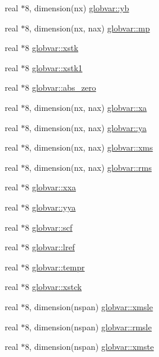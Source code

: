 \begin{DoxyCompactItemize}
\item 
real $\ast$8, dimension(nx) \hyperlink{namespaceglobvar_a77b51c294ee3b20cb6e14dcbf4cb6b3d}{globvar\+::yb}
\item 
real $\ast$8, dimension(nx, nax) \hyperlink{namespaceglobvar_a4616d2799c88911e5e46e57902cfa3a2}{globvar\+::mp}
\item 
real $\ast$8 \hyperlink{namespaceglobvar_a578ffe411cb075eda2ae3cf7781d1cb0}{globvar\+::xstk}
\item 
real $\ast$8 \hyperlink{namespaceglobvar_a6b041a8fbed932e28a5d0426dc9dc20a}{globvar\+::xstk1}
\item 
real $\ast$8 \hyperlink{namespaceglobvar_a2ffa8ff8b7b664c43c8c171090806037}{globvar\+::abs\+\_\+zero}
\item 
real $\ast$8, dimension(nx, nax) \hyperlink{namespaceglobvar_a8fc7e5c4a3ef5051faf2730bf96a2dd1}{globvar\+::xa}
\item 
real $\ast$8, dimension(nx, nax) \hyperlink{namespaceglobvar_a53530e27d02ce2d76dafdca13f4b8ed7}{globvar\+::ya}
\item 
real $\ast$8, dimension(nx, nax) \hyperlink{namespaceglobvar_a955f6af8ca3ef2d2ad1dc152f84503a6}{globvar\+::xms}
\item 
real $\ast$8, dimension(nx, nax) \hyperlink{namespaceglobvar_aad49b3042db6c69206144f3ad9ea8192}{globvar\+::rms}
\item 
real $\ast$8 \hyperlink{namespaceglobvar_afad18bcdd2851c42afdc9ace1240fad7}{globvar\+::xxa}
\item 
real $\ast$8 \hyperlink{namespaceglobvar_a8226618dfb2a1887783a72d33a768b30}{globvar\+::yya}
\item 
real $\ast$8 \hyperlink{namespaceglobvar_a7089ef5d62767168aa5fe9700d53846e}{globvar\+::scf}
\item 
real $\ast$8 \hyperlink{namespaceglobvar_afb77a410f2b53e316ddde5d09eed140e}{globvar\+::lref}
\item 
real $\ast$8 \hyperlink{namespaceglobvar_a6952feddb2848759567dd3a4a3f464b8}{globvar\+::tempr}
\item 
real $\ast$8 \hyperlink{namespaceglobvar_a0f0a537e4026bb8d0df6ff2fac7b4071}{globvar\+::xstck}
\item 
real $\ast$8, dimension(nspan) \hyperlink{namespaceglobvar_a117b11c9bdd95f9e6a9c27dc6ac426a1}{globvar\+::xmsle}
\item 
real $\ast$8, dimension(nspan) \hyperlink{namespaceglobvar_a464f621e496fe27197a4d513b4e72599}{globvar\+::rmsle}
\item 
real $\ast$8, dimension(nspan) \hyperlink{namespaceglobvar_a111fb1194bc2c6bcc780a4b7bcd10d25}{globvar\+::xmste}

\end{DoxyCompactItemize}

